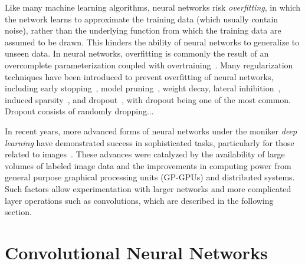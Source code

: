 Like many machine learning algorithms, neural networks risk \textit{overfitting}, in which the network learns to approximate the training data (which usually contain noise), rather than the underlying function from which the training data are assumed to be drawn.
This hinders the ability of neural networks to generalize to unseen data.
In neural networks, overfitting is commonly the result of an overcomplete parameterization coupled with overtraining~\cite{reed1993, dalianis1993}.
Many regularization techniques have been introduced to prevent overfitting of neural networks, including early stopping~\cite{morgan1990}, model pruning~\cite{reed1993}, weight decay\cite{krogh1992}, lateral inhibition~\cite{krizhevsky2012}, induced sparsity~\cite{ng2011, makhzani2015}, and dropout~\cite{srivastava2014}, with dropout being one of the most common. 
Dropout consists of randomly dropping...


In recent years, more advanced forms of neural networks under the moniker \textit{deep learning} have demonstrated success in sophisticated tasks, particularly for those related to images~\cite{lecun2015}. 
These advances were catalyzed by the availability of large volumes of labeled image data and the improvements in computing power from general purpose graphical processing units (GP-GPUs) and distributed systems.
Such factors allow experimentation with larger networks and more complicated layer operations such as convolutions, which are described in the following section.

\section{Convolutional Neural Networks}

